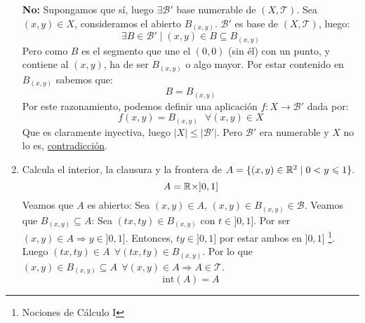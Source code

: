 \documentclass[12pt]{article}
\begin{document}
\begin{ejercicio}[4.5 puntos]
\begin{enumerate}[label=(\alph*)]
                \noindent \textbf{No:}\newline
                Supongamos que sí, luego $\exists \mathcal{B}'$ base numerable de $(X, \mathcal{T})$.\newline
                Sea $(x,y) \in X$, consideramos el abierto $B_{(x,y)}$. $\mathcal{B}'$ es base de $(X, \mathcal{T})$, luego:
                $$\exists B \in \mathcal{B}' \mid (x,y) \in B \subseteq B_{(x,y)}$$
                Pero como $B$ es el segmento que une el $(0,0)$ (sin él) con un punto, y contiene al $(x,y)$, ha de ser $B_{(x,y)}$ o algo mayor. Por estar contenido en $B_{(x,y)}$ sabemos que:
                $$B = B_{(x,y)}$$
                Por este razonamiento, podemos definir una aplicación $f:X \rightarrow \mathcal{B}'$ dada por:
                $$f(x,y) = B_{(x,y)}~~~\forall (x,y) \in X$$
                Que es claramente inyectiva, luego $|X| \leq |\mathcal{B}'|$. Pero $\mathcal{B}'$ era numerable y $X$ no lo es, \underline{contradicción}.
                
            \item Calcula el interior, la clausura y la frontera de $A = \{ (x,y) \in \mathbb{R}^2 \mid 0 < y \leqslant 1\}$.\\

                \noindent
                $$A = \mathbb{R} \times ]0,1]$$
                Veamos que $A$ es abierto:\newline
                Sea $(x,y) \in A$, $(x,y) \in B_{(x,y)} \in \mathcal{B}$. Veamos que $B_{(x,y)} \subseteq A$:\newline
                Sea $(tx, ty) \in B_{(x,y)}$ con $t \in ]0,1]$. Por ser $(x,y) \in A \Rightarrow y \in ]0,1]$.\newline
                Entonces, $ty \in ]0,1]$ por estar ambos en $]0,1]$ \footnote{Nociones de Cálculo I}.\newline
                Luego $(tx, ty) \in A~~\forall (tx, ty) \in B_{(x,y)}$.\newline
                Por lo que $(x,y) \in B_{(x,y)} \subseteq A~~\forall (x,y) \in A \Rightarrow A \in \mathcal{T}$.
                $$\mathrm{int}(A) = A$$


\end{enumerate}
\end{ejercicio}
\end{document}

